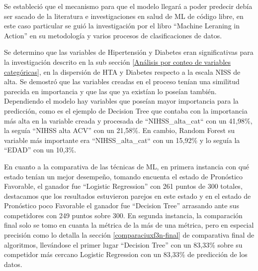 \par Se estableció que el mecanismo para que el modelo llegará a poder predecir debía ser sacado de la literatura e investigaciones en salud de ML de código libre, en este caso particular se guió la investigación por el libro “Machine Leraning in Action” en su metodología y varios procesos de clasificaciones de datos. \\

\par Se determino que las variables de Hipertensión y Diabetes eran significativas para la investigación descrito en la sub sección \ref{Análisis por conteo de variables categóricas}, en la dispersión de HTA y Diabetes respecto a la escala NISS de alta. Se demostró que las variables creadas en el proceso tenían una similitud parecida en importancia y que las que ya existían lo poseían también. Dependiendo el modelo hay variables que poseían mayor importancia para la predicción, como es el ejemplo de Decision Tree que contaba con la importancia más alta en la variable creada y procesada de “NIHSS\_alta\_cat“ con un 41,98\%, la seguía “NIHSS alta ACV” con un 21,58\%. En cambio, Random Forest su variable más importante era “NIHSS\_alta\_cat“ con un 15,92\% y lo seguía la “EDAD” con un 10,3\%.\\

\par En cuanto a la comparativa de las técnicas de ML, en primera instancia con qué estado tenían un mejor desempeño, tomando encuenta el estado de Pronóstico Favorable, el ganador fue “Logistic Regression” con 261 puntos de 300 totales, destacamos que los resultados estuvieron parejos en este estado y en el estado de Pronóstico poco Favorable el ganador fue “Decision Tree” arrasando ante sus competidores con 249 puntos sobre 300. En segunda instancia, la comparación final solo se tomo en cuanta la métrica de la más de una métrica, pero en especial precisión como lo detalla la sección \ref{comparaciuxf3n-final} de comparativa final de algoritmos, llevándose el primer lugar “Decision Tree” con un 83,33\% sobre su competidor más cercano Logistic Regression con un 83,33\% de predicción de los datos.\\

